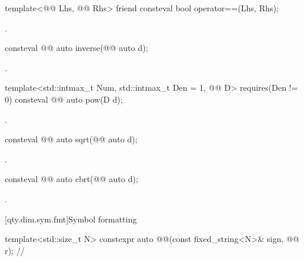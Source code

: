 \begin{itemdecl}
template<@@ Lhs, @@ Rhs>
friend consteval bool operator==(Lhs, Rhs);
\end{itemdecl}

\begin{itemdescr}
\pnum
\returns
{}.
\end{itemdescr}

\begin{itemdecl}
consteval @@ auto inverse(@@ auto d);
\end{itemdecl}

\begin{itemdescr}
\pnum
\returns
{}.
\end{itemdescr}

\begin{itemdecl}
template<std::intmax_t Num, std::intmax_t Den = 1, @@ D>
  requires(Den != 0)
consteval @@ auto pow(D d);
\end{itemdecl}

\begin{itemdescr}
\pnum
\returns
{}.
\end{itemdescr}

\begin{itemdecl}
consteval @@ auto sqrt(@@ auto d);
\end{itemdecl}

\begin{itemdescr}
\pnum
\returns
{}.
\end{itemdescr}

\begin{itemdecl}
consteval @@ auto cbrt(@@ auto d);
\end{itemdecl}

\begin{itemdescr}
\pnum
\returns
{}.
\end{itemdescr}

[qty.dim.sym.fmt]{Symbol formatting}

\begin{itemdecl}
template<std::size_t N>
constexpr auto @@(const fixed_string<N>& sign, @@ r);  // \expos
\end{itemdecl}

